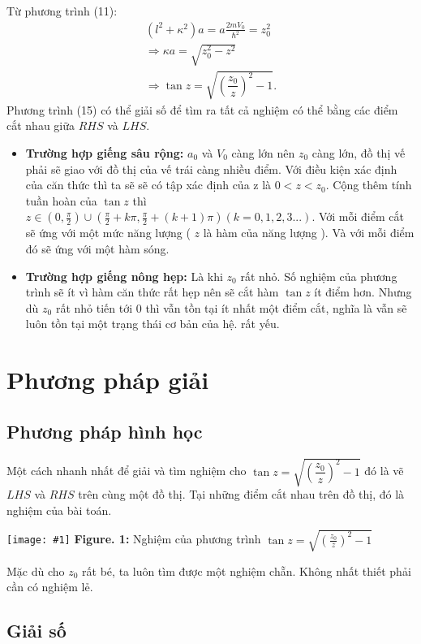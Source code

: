 \documentclass{article}
\newcommand{\image}[3]{
	\begin{center}
		\texttt{[image: \#1]}
		\textbf{Figure. #2:} #3
		\label{fig:#1}
	\end{center}
}
\begin{document}
	Từ phương trình (11):
	\begin{align}
		(l^2 + \kappa^2)a = a\frac{2mV_0}{\hbar^2} = z_0^2 \nonumber\\
		\Rightarrow \kappa a = \sqrt{z_0^2 - z^2} \\
		\Rightarrow \tan z = \sqrt{\left( \dfrac{z_0}{z} \right)^2 - 1}.
	\end{align}
	Phương trình (15) có thể giải số để tìm ra tất cả nghiệm có thể bằng các điểm cắt nhau giữa $RHS$ và $LHS$.
	\begin{itemize}
		\item \textbf{Trường hợp giếng sâu rộng:} $a_0$ và $V_0$ càng lớn nên $z_0$ càng lớn, đồ thị vế phải sẽ giao với đồ thị của vế trái càng nhiều điểm. Với điều kiện xác định của căn thức thì ta sẽ sẽ có tập xác định của z là $0 < z < z_0$. Cộng thêm tính tuần hoàn của $\tan{z}$ thì $z \in (0,\frac{\pi}{2}) \cup (\frac{\pi}{2} + k\pi , \frac{\pi}{2} + (k+1)\pi) (k= 0,1,2,3...)$. Với mỗi điểm cắt sẽ ứng với một mức năng lượng ( $z$ là hàm của năng lượng ). Và với mỗi điểm đó sẽ ứng với một hàm sóng.
		\item \textbf{Trường hợp giếng nông hẹp:} Là khi $z_0$ rất nhỏ. Số nghiệm của phương trình sẽ ít vì hàm căn thức rất hẹp nên sẽ cắt hàm $\tan{z}$ ít điểm hơn. Nhưng dù $z_0$ rất nhỏ tiến tới 0 thì vẫn tồn tại ít nhất một điểm cắt, nghĩa là vẫn sẽ luôn tồn tại một trạng thái cơ bản của hệ. rất yếu.
	\end{itemize}
	
	\newpage
	
	\section{Phương pháp giải}
	\subsection{Phương pháp hình học}
	
	Một cách nhanh nhất để giải và tìm nghiệm cho $\tan z = \sqrt{\left( \dfrac{z_0}{z} \right)^2 - 1}$ đó là vẽ $LHS$ và $RHS$ trên cùng một đồ thị. Tại những điểm cắt nhau trên đồ thị, đó là nghiệm của bài toán.
	\image{tan.pdf}{1}{Nghiệm của phương trình $\tan z = \sqrt{\left( \frac{z_0}{z} \right)^2 - 1}$}
	Mặc dù cho $z_0$ rất bé, ta luôn tìm được một nghiệm chẵn. Không nhất thiết phải cần có nghiệm lẻ.
	\subsection{Giải số}
	
\end{document}
